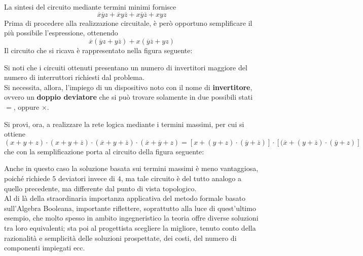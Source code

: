 \documentclass[a4paper]{extarticle}
\begin{document}
\vspace{1em}
\noindent
La sintesi del circuito mediante termini minimi fornisce
\[\overline{x} \overline{y} z + \overline{x} y \overline{z} + x \overline{y} \overline{z} + xyz\]
Prima di procedere alla realizzazione circuitale, è però opportuno semplificare il più possibile l'espressione, ottenendo
\[\overline{x} (\overline{y}z + y \overline{z}) + x (\overline{y} \overline{z} + yz)\]
Il circuito che si ricava è rappresentato nella figura seguente:

Si noti che i circuiti ottenuti presentano un numero di invertitori maggiore del numero di interruttori richiesti dal problema.\\
Si necessita, allora, l'impiego di un dispositivo noto con il nome di \textbf{invertitore}, ovvero un \textbf{doppio deviatore} che si può trovare solamente in due possibili stati \(=\), oppure \(\times\).

\vspace{1em}
\noindent
Si provi, ora, a realizzare la rete logica mediante i termini massimi, per cui si ottiene
\[(x + y + z) \cdot (x + y + \overline{z}) \cdot (\overline{x} + y + \overline{z}) \cdot (\overline{x} + \overline{y} + z) = [x + (y +z) \cdot (\overline{y} + \overline{z})] \cdot [(\overline{x} + (y + \overline{z}) \cdot (\overline{y} + z)]\]
che con la semplificazione porta al circuito della figura seguente:


Anche in questo caso la soluzione basata sui termini massimi è meno vantaggiosa, poiché richiede \(5\) deviatori invece di \(4\), ma tale circuito è del tutto analogo a quello precedente, ma differente dal punto di vista topologico.\\
Al di là della straordinaria importanza applicativa del metodo formale basato sull’Algebra Booleana, importante riflettere, soprattutto alla luce di quest’ultimo esempio, che molto spesso in ambito ingegneristico la teoria offre diverse soluzioni tra loro equivalenti; sta poi al progettista scegliere la migliore, tenuto conto della razionalità e semplicità delle soluzioni prospettate, dei costi, del numero di componenti impiegati ecc.
\end{document}
